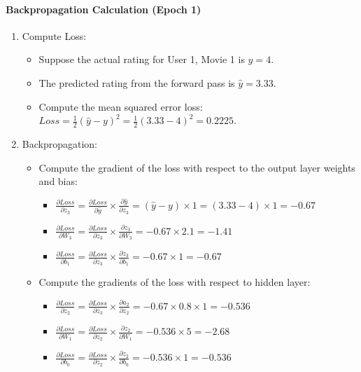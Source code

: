 \documentclass[a4paper]{article}
\theoremstyle{plain}
\theoremstyle{definition}
\begin{document}
\paragraph{Backpropagation Calculation (Epoch 1)}
\begin{enumerate}
  \item Compute Loss:
  \begin{itemize}
    \item Suppose the actual rating for User 1, Movie 1 is \( y = 4 \).
    \item The predicted rating from the forward pass is \( \hat{y} = 3.33 \).
    \item Compute the mean squared error loss: \( Loss = \frac{1}{2} (\hat{y} - y)^2 = \frac{1}{2} (3.33 - 4)^2 = 0.2225 \).
  \end{itemize}
  \item Backpropagation:
  \begin{itemize}
    \item Compute the gradient of the loss with respect to the output layer weights and bias:
    \begin{itemize}
      \item \( \frac{\partial Loss}{\partial z_3} = \frac{\partial Loss}{\partial \hat{y}} \times \frac{\partial \hat{y}}{\partial z_3} = (\hat{y} - y) \times 1 = (3.33 - 4) \times 1 = -0.67 \)
      \item \( \frac{\partial Loss}{\partial W_3} = \frac{\partial Loss}{\partial z_3} \times \frac{\partial z_3}{\partial W_3} = -0.67 \times 2.1 = -1.41 \)
      \item \( \frac{\partial Loss}{\partial b_1} = \frac{\partial Loss}{\partial z_3} \times \frac{\partial z_3}{\partial b_1} = -0.67 \times 1 = -0.67 \)
    \end{itemize}
    \item Compute the gradients of the loss with respect to hidden layer:
    \begin{itemize}
      \item \( \frac{\partial Loss}{\partial z_2} = \frac{\partial Loss}{\partial z_3} \times \frac{\partial a_2}{\partial z_2} = -0.67 \times 0.8 \times 1 = -0.536 \)
      \item \( \frac{\partial Loss}{\partial W_1} = \frac{\partial Loss}{\partial z_2} \times \frac{\partial z_2}{\partial W_1} = -0.536 \times 5 = -2.68 \)
      \item \( \frac{\partial Loss}{\partial b_0} = \frac{\partial Loss}{\partial z_2} \times \frac{\partial z_2}{\partial b_0} = -0.536 \times 1 = -0.536 \)

\end{itemize}
\end{itemize}
\end{enumerate}
\end{document}
